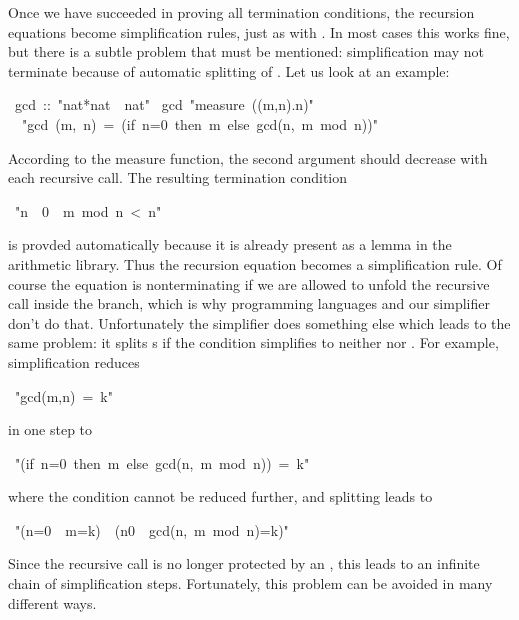 \begin{isabelle}%
%
\begin{isamarkuptext}%
Once we have succeeded in proving all termination conditions, the recursion
equations become simplification rules, just as with
. In most cases this works fine, but there is a subtle
problem that must be mentioned: simplification may not
terminate because of automatic splitting of .
Let us look at an example:%
\end{isamarkuptext}%
~gcd~::~{"}nat*nat~{\isasymRightarrow}~nat{"}\isanewline
{}~gcd~{"}measure~({\isasymlambda}(m,n).n){"}\isanewline
~~{"}gcd~(m,~n)~=~(if~n=0~then~m~else~gcd(n,~m~mod~n)){"}%
\begin{isamarkuptext}%
\noindent
According to the measure function, the second argument should decrease with
each recursive call. The resulting termination condition%
\end{isamarkuptext}%
~{"}n~{\isasymnoteq}~0~{\isasymLongrightarrow}~m~mod~n~<~n{"}%
\begin{isamarkuptext}%
\noindent
is provded automatically because it is already present as a lemma in the
arithmetic library. Thus the recursion equation becomes a simplification
rule. Of course the equation is nonterminating if we are allowed to unfold
the recursive call inside the  branch, which is why programming
languages and our simplifier don't do that. Unfortunately the simplifier does
something else which leads to the same problem: it splits s if the
condition simplifies to neither  nor . For
example, simplification reduces%
\end{isamarkuptext}%
~{"}gcd(m,n)~=~k{"}%
\begin{isamarkuptext}%
\noindent
in one step to%
\end{isamarkuptext}%
~{"}(if~n=0~then~m~else~gcd(n,~m~mod~n))~=~k{"}%
\begin{isamarkuptext}%
\noindent
where the condition cannot be reduced further, and splitting leads to%
\end{isamarkuptext}%
~{"}(n=0~{\isasymlongrightarrow}~m=k)~{\isasymand}~(n{\isasymnoteq}0~{\isasymlongrightarrow}~gcd(n,~m~mod~n)=k){"}%
\begin{isamarkuptext}%
\noindent
Since the recursive call  is no longer protected by
an , this leads to an infinite chain of simplification steps.
Fortunately, this problem can be avoided in many different ways.


\end{isamarkuptext}
\end{isabelle}

